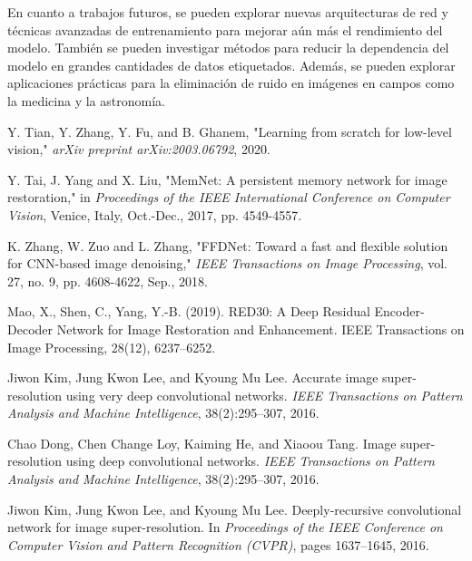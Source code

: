 \documentclass[a4paper,
               ]{jacow}
\begin{document}
En cuanto a trabajos futuros, se pueden explorar nuevas arquitecturas de red y técnicas avanzadas de entrenamiento para mejorar aún más el rendimiento del modelo. También se pueden investigar métodos para reducir la dependencia del modelo en grandes cantidades de datos etiquetados. Además, se pueden explorar aplicaciones prácticas para la eliminación de ruido en imágenes en campos como la medicina y la astronomía.
%
%
%
	{\printbibliography}%
	{
	\begin{thebibliography}{9} %
	
        Y. Tian, Y. Zhang, Y. Fu, and B. Ghanem, "Learning from scratch for low-level vision," \textit{arXiv preprint arXiv:2003.06792}, 2020.

	
        Y. Tai, J. Yang and X. Liu, "MemNet: A persistent memory network for image restoration," in \emph{Proceedings of the IEEE International Conference on Computer Vision}, Venice, Italy, Oct.-Dec., 2017, pp. 4549-4557.

        K. Zhang, W. Zuo and L. Zhang, "FFDNet: Toward a fast and flexible solution for CNN-based image denoising," \emph{IEEE Transactions on Image Processing}, vol. 27, no. 9, pp. 4608-4622, Sep., 2018.


        Mao, X., Shen, C.,   Yang, Y.-B. (2019). RED30: A Deep Residual Encoder-Decoder Network for Image Restoration and Enhancement. IEEE Transactions on Image Processing, 28(12), 6237–6252.

        Jiwon Kim, Jung Kwon Lee, and Kyoung Mu Lee.
        Accurate image super-resolution using very deep convolutional networks.
        {\em IEEE Transactions on Pattern Analysis and Machine Intelligence}, 38(2):295--307, 2016.

        Chao Dong, Chen Change Loy, Kaiming He, and Xiaoou Tang.
        Image super-resolution using deep convolutional networks.
        {\em IEEE Transactions on Pattern Analysis and Machine Intelligence}, 38(2):295--307, 2016.

        Jiwon Kim, Jung Kwon Lee, and Kyoung Mu Lee.
        \newblock Deeply-recursive convolutional network for image super-resolution.
        \newblock In {\em Proceedings of the IEEE Conference on Computer Vision and Pattern Recognition (CVPR)}, pages 1637--1645, 2016.
	

\end{thebibliography}}
\end{document}
